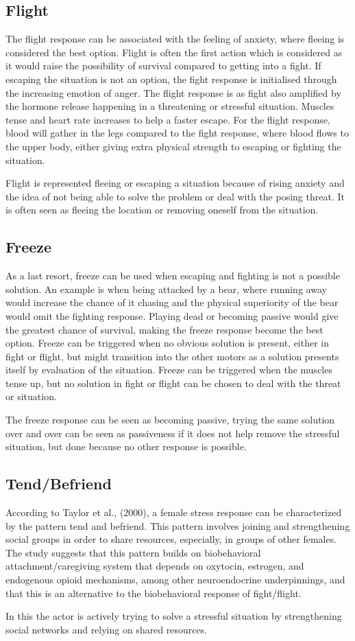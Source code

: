 \subsection{Flight}
The flight response can be associated with the feeling of anxiety, where fleeing is considered the best option. Flight is often the first action which is considered as it would raise the possibility of survival compared to getting into a fight. If escaping the situation is not an option, the fight response is initialised through the increasing emotion of anger. The flight response is as fight also amplified by the hormone release happening in a threatening or stressful situation. Muscles tense and heart rate increases to help a faster escape. For the flight response, blood will gather in the legs compared to the fight response, where blood flows to the upper body, either giving extra physical strength to escaping or fighting the situation. 

Flight is represented fleeing or escaping a situation because of rising anxiety and the idea of not being able to solve the problem or deal with the posing threat. It is often seen as fleeing the location or removing oneself from the situation.

\subsection{Freeze}
As a last resort, freeze can be used when escaping and fighting is not a possible solution. An example is when being attacked by a bear, where running away would increase the chance of it chasing and the physical superiority of the bear would omit the fighting response. Playing dead or becoming passive would give the greatest chance of survival, making the freeze response become the best option. Freeze can be triggered when no obvious solution is present, either in fight or flight, but might transition into the other motors as a solution presents itself by evaluation of the situation. Freeze can be triggered when the muscles tense up, but no solution in fight or flight can be chosen to deal with the threat or situation.

The freeze response can be seen as becoming passive, trying the same solution over and over can be seen as passiveness if it does not help remove the stressful situation, but done because no other response is possible.

\subsection{Tend/Befriend}
According to Taylor et al., (2000), a female stress response can be characterized by the pattern tend and befriend. This pattern involves joining and strengthening social groups in order to share resources, especially, in groups of other females. The study suggests that this pattern builds on biobehavioral attachment/caregiving system that depends on oxytocin, estrogen, and endogenous opioid mechanisms, among other neuroendocrine underpinnings, and that this is an alternative to the biobehavioral response of fight/flight. 

In this the actor is actively trying to solve a stressful situation by strengthening social networks and relying on shared resources. \cite{tendbefriend}

